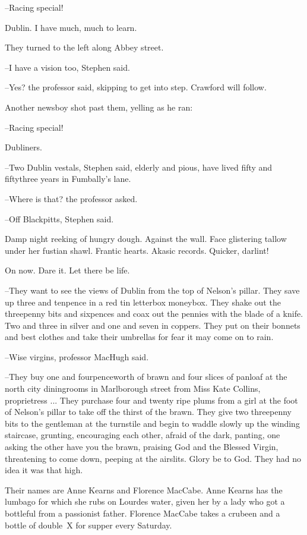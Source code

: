 --Racing special!

Dublin.
I have much, much to learn.

They turned to the left along Abbey street.

--I have a vision too,
Stephen said.

--Yes?
the professor said,
skipping to get into step.
Crawford will follow.

Another newsboy shot past them,
yelling as he ran:

--Racing special!



Dubliners.

--Two Dublin vestals,
Stephen said,
elderly and pious,
have lived fifty and fiftythree years in Fumbally's lane.

--Where is that?
the professor asked.

--Off Blackpitts,
Stephen said.

Damp night reeking of hungry dough.
Against the wall.
Face glistering tallow under her fustian shawl.
Frantic hearts.
Akasic records.
Quicker, darlint!

On now.
Dare it.
Let there be life.

--They want to see the views of Dublin from the top of Nelson's pillar.
They save up three and tenpence in a red tin letterbox moneybox.
They shake out the threepenny bits and sixpences
and coax out the pennies with the blade of a knife.
Two and three in silver
and one and seven in coppers.
They put on their bonnets and best clothes
and take their umbrellas for fear it may come on to rain.

--Wise virgins,
professor MacHugh said.



--They buy one and fourpenceworth of brawn
and four slices of panloaf
at the north city diningrooms in Marlborough street
from Miss Kate Collins, proprietress ...
They purchase four and twenty ripe plums
from a girl at the foot of Nelson's pillar
to take off the thirst of the brawn.
They give two threepenny bits to the gentleman at the turnstile
and begin to waddle slowly up the winding staircase,
grunting,
encouraging each other,
afraid of the dark,
panting,
one asking the other
have you the brawn,
praising
God and the Blessed Virgin,
threatening to come down,
peeping at the airslits.
Glory be to God.
They had no idea it was that high.

Their names are Anne Kearns and Florence MacCabe.
Anne Kearns has the lumbago for which she rubs on Lourdes water,
given her by a lady
who got a bottleful from a passionist father.
Florence MacCabe takes a crubeen and a bottle of double~X for supper every Saturday.

